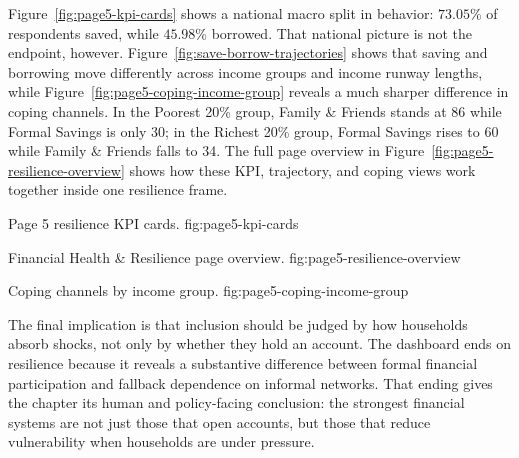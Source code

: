 \documentclass[../main.tex]{subfiles}
\begin{document}
Figure~\ref{fig:page5-kpi-cards} shows a national macro split in behavior:
\(73.05\%\) of respondents saved, while \(45.98\%\) borrowed. That national
picture is not the endpoint, however. Figure~\ref{fig:save-borrow-trajectories}
shows that saving and borrowing move differently across income groups and income
runway lengths, while Figure~\ref{fig:page5-coping-income-group} reveals a much
sharper difference in coping channels. In the Poorest 20\% group, Family \&
Friends stands at 86 while Formal Savings is only 30; in the Richest 20\%
group, Formal Savings rises to 60 while Family \& Friends falls to 34. The full
page overview in Figure~\ref{fig:page5-resilience-overview} shows how these KPI,
trajectory, and coping views work together inside one resilience frame.

{Page 5 resilience KPI cards.}
{fig:page5-kpi-cards}

{Financial Health \& Resilience page overview.}
{fig:page5-resilience-overview}

{Coping channels by income group.}
{fig:page5-coping-income-group}

The final implication is that inclusion should be judged by how households
absorb shocks, not only by whether they hold an account. The dashboard ends on
resilience because it reveals a substantive difference between formal financial
participation and fallback dependence on informal networks. That ending gives
the chapter its human and policy-facing conclusion: the strongest financial
systems are not just those that open accounts, but those that reduce
vulnerability when households are under pressure.
\end{document}
